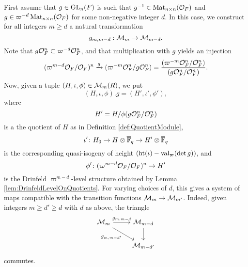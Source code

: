 \documentclass[../main.tex]{subfiles}
\begin{document}
First assume that $g \in \operatorname{GL}_n(F)$ is such that $g^{-1} \in \operatorname{Mat}_{n\times
n}(\mathcal{O}_F)$ and $g \in \varpi^{-d} \operatorname{Mat}_{n \times n}(\mathcal{O}_F)$ for some non-negative
integer $d$. In this case, we construct for all integers $m \geq d$ a natural
transformation
\begin{equation*}
  g_{m, m-d}: \mathcal{M}_m \to \mathcal{M}_{m-d}.
\end{equation*}
Note that $g \mathcal{O}_F^n \subset \varpi^{-d} \mathcal{O}_F^n$, and that multiplication with
$g$ yields an injection
\begin{equation*}
  (\varpi^{m-d}\mathcal{O}_F/\mathcal{O}_F)^n \xrightarrow{g} (\varpi^{-m}\mathcal{O}_F^n/g\mathcal{O}_F^n) = 
  \frac{(\varpi^{-m} \mathcal{O}_F^n /\mathcal{O}_F^n)}{(g \mathcal{O}_F^n/\mathcal{O}_F^n)}.
\end{equation*}
Now, given a tuple $(H, \iota, \phi) \in \mathcal{M}_m(R)$, we put $$(H, \iota, \phi).g = (H', \iota', \phi'),$$ where 
$$H'= H/\phi(g\mathcal{O}_F^n/\mathcal{O}_F^n)$$ 
is a the quotient of $H$ as in Definition \ref{def:QuotientModule}, 
$$\iota'\colon H_0 \to H \otimes \overline {\mathbb{F}}_q \to H' \otimes \overline {\mathbb{F}}_q$$ 
is the corresponding quasi-isogeny of height 
$(\textnormal{ht}(\iota) - \mathrm{val}_\varpi( \det g))$, and 
$$\phi'\colon (\varpi^{m-d}\mathcal{O}_F/\mathcal{O}_F)^n \to H'$$ 
is the Drinfeld $\varpi^{m-d}$-level structure obtained by Lemma
\ref{lem:DrinfeldLevelOnQuotients}. 
For varying choices of $d$, this gives a system of maps compatible with the 
transition functions $\mathcal{M}_m \to \mathcal{M}_{m'}$. Indeed, given integers $m \geq d'
\geq d$ with $d$ as above, the triangle 
\begin{equation*}
\begin{tikzcd}[ampersand replacement=\&]
	{\cM_{m}} \& {\cM_{m-d}} \\
	\& {\cM_{m-d'}}
	\arrow["{g_{m,m-d}}", from=1-1, to=1-2]
	\arrow["{g_{m,m-d'}}"', from=1-1, to=2-2]
	\arrow[from=1-2, to=2-2]
\end{tikzcd}
\end{equation*}
commutes.
\end{document}
